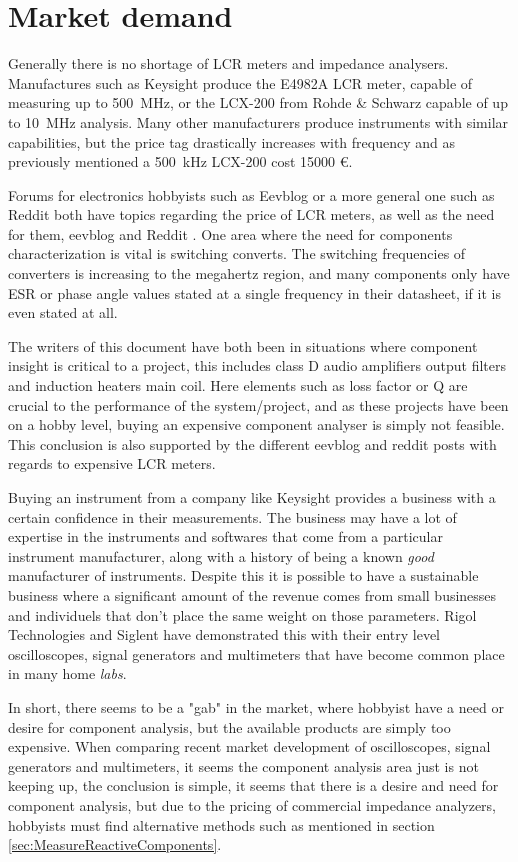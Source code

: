\section{Market demand} \label{sec:ProfessionalMarketDemand}
Generally there is no shortage of LCR meters and impedance analysers. Manufactures such as Keysight produce the E4982A LCR meter,
 capable of measuring up to \SI{500}{\mega\hertz}, or the LCX-200 from Rohde \& Schwarz capable of up to \SI{10}{\mega\hertz}
analysis. Many other manufacturers produce instruments with similar capabilities, but the price tag drastically increases with frequency
and as previously mentioned a \SI{500}{\kilo\hertz} LCX-200 cost 15000 €. 

Forums for electronics hobbyists such as Eevblog or a more general one such as Reddit both have topics regarding the price of LCR
meters, as well as the need for them, eevblog \cite{EevblogLCR} and Reddit \cite{RedditLCR}. One area where the need for components
characterization is vital is switching converts. The switching frequencies of converters is increasing to the megahertz region, and 
many components only have ESR or phase angle values stated at a single frequency in their datasheet, if it is even stated at all.

The writers of this document have both been in situations where component insight is critical to a project, this includes class D
audio amplifiers output filters and induction heaters main coil. Here elements such as loss factor or Q are crucial to the performance
of the system/project, and as these projects have been on a hobby level, buying an expensive component analyser is simply not feasible.
This conclusion is also supported by the different eevblog and reddit posts with regards to expensive LCR meters.

Buying an instrument from a company like Keysight provides a business with a certain confidence in their measurements. The business may have a lot of expertise in the instruments and softwares that come from a particular instrument manufacturer, along with a history of being a known \textit{good} manufacturer of instruments. Despite this it is possible to have a sustainable business where a significant amount of the revenue comes from small businesses and individuels that don't place the same weight on those parameters. Rigol Technologies and Siglent have demonstrated this with their entry level oscilloscopes, signal generators and multimeters that have become common place in many home \textit{labs}. 

In short, there seems to be a "gab" in the market, where hobbyist have a need or desire for component analysis, but the available
products are simply too expensive. When comparing recent market development of oscilloscopes, signal generators and multimeters,
it seems the component analysis area just is not keeping up, the conclusion is simple, it seems that there is a desire and need for component analysis, but due to the pricing of commercial 
impedance analyzers, hobbyists must find alternative methods such as mentioned in section \ref*{sec:MeasureReactiveComponents}. 